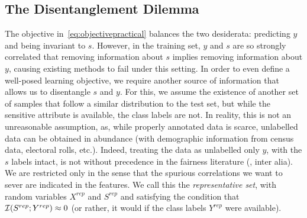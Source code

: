 \subsection{The Disentanglement Dilemma}
%
The objective in~\eqref{eq:objectivepractical} balances the two desiderata: predicting $y$ and
being invariant to $s$.
%
However, in the training set, $y$ and $s$ are so strongly correlated that removing information
about $s$ implies removing information about $y$, causing existing methods to fail under this
setting.
In order to even define a well-posed learning objective, we require another source of information that
allows us to disentangle $s$ and $y$.
%
For this, we assume the existence of another set of samples that follow a similar distribution to
the test set, but while the sensitive attribute is available, the class labels are not. 
%
In reality, this is not an unreasonable assumption, as, while properly annotated data is scarce,
unlabelled data can be obtained in abundance (with demographic information from census data,
electoral rolls, etc.).
%
Indeed, treating the data as unlabelled only \wrt{} \(y\), with the $s$ labels intact, is not
without precedence in the fairness literature (\cite{wick2019unlocking, creager2019flexibly}, inter alia).
%
We are restricted only in the sense that the spurious correlations we want to sever are indicated
in the features.
%
We call this the \emph{representative set}, with random variables $X^{rep}$ and \( S^{rep} \) and
satisfying the condition that \( {\mathcal{I}}(S^{rep}; Y^{rep}) \approx 0 \) (or rather, it would if the
class labels \( Y^{rep} \) were available).

